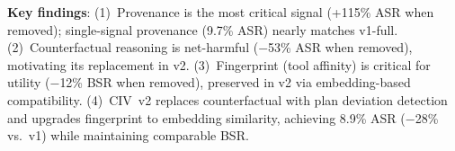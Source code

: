 \begin{table}[t]
\centering
\small
\caption{CIV ablation study on the 250-case core benchmark (GPT-4o, single run). Top: CIV~v1 component ablation. Bottom: CIV~v2 (main table) incorporating ablation insights. $\Delta$ASR relative to v1-full.}
\label{tab:civ_ablation}
\begin{flushleft}
\scriptsize
\textbf{Key findings}: (1)~Provenance is the most critical signal (+115\% ASR when removed); single-signal provenance (9.7\% ASR) nearly matches v1-full.
(2)~Counterfactual reasoning is net-harmful ($-$53\% ASR when removed), motivating its replacement in v2.
(3)~Fingerprint (tool affinity) is critical for utility ($-$12\% BSR when removed), preserved in v2 via embedding-based compatibility.
(4)~CIV~v2 replaces counterfactual with plan deviation detection and upgrades fingerprint to embedding similarity, achieving 8.9\% ASR ($-$28\% vs.\ v1) while maintaining comparable BSR.
\end{flushleft}
\end{table}
